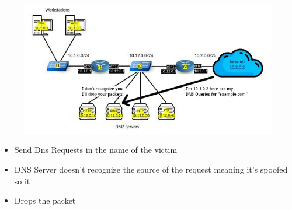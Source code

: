 \documentclass{beamer}
\begin{document}
\begin{frame}
\begin{columns}
\begin{column}{0.5\textwidth}
        \begin{figure}
            \centering
            \includegraphics[width=\textwidth]{dns_defense.jpg}\\
        \end{figure}
            \begin{itemize}[label={}]
                \item \footnotesize Send Dns Requests in the name of the victim
                \item \footnotesize DNS Server doesn't recognize the source of the request meaning it's spoofed so it
                \item \footnotesize Drops the packet
            \end{itemize}
    \end{column}
\end{columns}
\end{frame}
\end{document}
